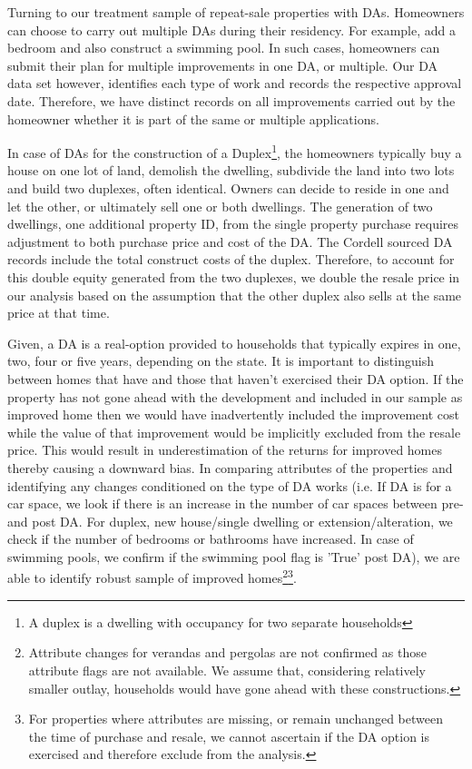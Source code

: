 \documentclass[AEJ,reqno, draftmode]{AEA} %
\begin{document}
Turning to our treatment sample of repeat-sale properties with DAs. Homeowners can choose to carry out multiple DAs during their residency. For example, add a bedroom and also construct a swimming pool. In such cases, homeowners can submit their plan for multiple improvements in one DA, or multiple. Our DA data set however, identifies each type of work and records the respective approval date. Therefore, we have distinct records on all improvements carried out by the homeowner whether it is part of the same or multiple applications.

In case of DAs for the construction of a Duplex\footnote{A duplex is a dwelling with occupancy for two separate households}, the homeowners typically buy a house on one lot of land, demolish the dwelling, subdivide the land into two lots and build two duplexes, often identical. Owners can decide to reside in one and let the other, or ultimately sell one or both dwellings. The generation of two dwellings, one additional property ID, from the single property purchase requires adjustment to both purchase price and cost of the DA. The Cordell sourced DA records include the total construct costs of the duplex. Therefore, to account for this double equity generated from the two duplexes, we double the resale price in our analysis based on the assumption that the other duplex also sells at the same price at that time. 

Given, a DA is a real-option provided to households that typically expires in one, two, four or five years, depending on the state. It is important to distinguish between homes that have and those that haven't exercised their DA option. If the property has not gone ahead with the development and included in our sample as improved home then we would have inadvertently included the improvement cost while the value of that improvement would be implicitly excluded from the resale price. This would result in underestimation of the returns for improved homes thereby causing a downward bias. In comparing attributes of the properties and identifying any changes conditioned on the type of DA works (i.e. If DA is for a car space, we look if there is an increase in the number of car spaces between pre- and post DA. For duplex, new house/single dwelling or extension/alteration, we check if the number of bedrooms or bathrooms have increased. In case of swimming pools, we confirm if the swimming pool flag is 'True' post DA), we are able to identify robust sample of improved homes\footnote{Attribute changes for verandas and pergolas are not confirmed as those attribute flags are not available. We assume that, considering relatively smaller outlay, households would have gone ahead with these constructions.}\footnote{For properties where attributes are missing, or remain unchanged between the time of purchase and resale, we cannot ascertain if the DA option is exercised and therefore exclude from the analysis.}.
\end{document}
